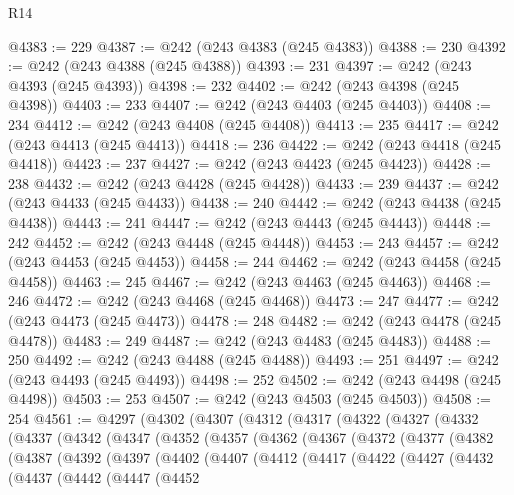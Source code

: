 \begin{lexlean}{R14}
\begin{coremodule}
@4383 := 229
@4387 := @242 (@243 @4383 (@245 @4383))
@4388 := 230
@4392 := @242 (@243 @4388 (@245 @4388))
@4393 := 231
@4397 := @242 (@243 @4393 (@245 @4393))
@4398 := 232
@4402 := @242 (@243 @4398 (@245 @4398))
@4403 := 233
@4407 := @242 (@243 @4403 (@245 @4403))
@4408 := 234
@4412 := @242 (@243 @4408 (@245 @4408))
@4413 := 235
@4417 := @242 (@243 @4413 (@245 @4413))
@4418 := 236
@4422 := @242 (@243 @4418 (@245 @4418))
@4423 := 237
@4427 := @242 (@243 @4423 (@245 @4423))
@4428 := 238
@4432 := @242 (@243 @4428 (@245 @4428))
@4433 := 239
@4437 := @242 (@243 @4433 (@245 @4433))
@4438 := 240
@4442 := @242 (@243 @4438 (@245 @4438))
@4443 := 241
@4447 := @242 (@243 @4443 (@245 @4443))
@4448 := 242
@4452 := @242 (@243 @4448 (@245 @4448))
@4453 := 243
@4457 := @242 (@243 @4453 (@245 @4453))
@4458 := 244
@4462 := @242 (@243 @4458 (@245 @4458))
@4463 := 245
@4467 := @242 (@243 @4463 (@245 @4463))
@4468 := 246
@4472 := @242 (@243 @4468 (@245 @4468))
@4473 := 247
@4477 := @242 (@243 @4473 (@245 @4473))
@4478 := 248
@4482 := @242 (@243 @4478 (@245 @4478))
@4483 := 249
@4487 := @242 (@243 @4483 (@245 @4483))
@4488 := 250
@4492 := @242 (@243 @4488 (@245 @4488))
@4493 := 251
@4497 := @242 (@243 @4493 (@245 @4493))
@4498 := 252
@4502 := @242 (@243 @4498 (@245 @4498))
@4503 := 253
@4507 := @242 (@243 @4503 (@245 @4503))
@4508 := 254
@4561 := @4297
    (@4302
      (@4307
        (@4312
          (@4317
            (@4322
              (@4327
                (@4332
                  (@4337
                    (@4342
                      (@4347
                        (@4352
                          (@4357
                            (@4362
                              (@4367
                                (@4372
                                  (@4377
                                    (@4382
                                      (@4387
                                        (@4392
                                          (@4397
                                            (@4402
                                              (@4407
                                                (@4412
                                                  (@4417
                                                    (@4422
                                                      (@4427
                                                        (@4432
                                                          (@4437
                                                            (@4442
                                                              (@4447
                                                                (@4452

\end{coremodule}
\end{lexlean}
